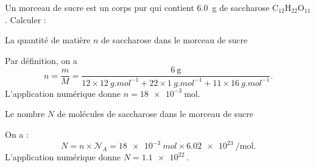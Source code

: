 \hauteurLargeurCadreReponse		{7mm}{4cm}
\initialisationEntrainement


\debutEntrainement

Un morceau de sucre est un corps pur qui contient \SI{6,0}{\gram} de saccharose $\textrm{C}_{12}\textrm{H}_{22}\textrm{O}_{11}$. Calculer : 


\begin{enonce}
La quantité de matière $n$ de saccharose dans le morceau de sucre
\end{enonce}


\begin{corrige}
Par définition, on a
\[
n=\frac{m}{M}=\frac{\SI{6}{\gram}}{12\times \SI{12}{g.mol^{-1}}+22\times\SI{1}{g.mol^{-1}}+11\times\SI{16}{g.mol^{-1}}}.
\]
L'application numérique donne $n=\SI{18e-3}{\mole}$.
\end{corrige}


\begin{enonce}
Le nombre $N$ de molécules de saccharose dans le morceau de sucre
\end{enonce}


\begin{corrige}
On a :
\[
N=n\times\mathcal{N}_A=\SI{18e-3}{mol}\times\SI{6,02e23}{\per\mol}.
\]
L'application numérique donne $N=\SI{1,1e22}{}$.
\end{corrige}


\finEntrainement


